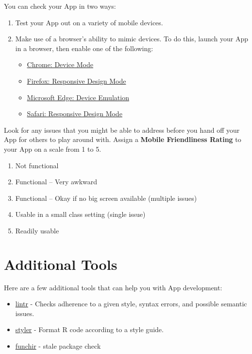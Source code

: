 \documentclass[
]{book}
\providecommand{\tightlist}{%
  \setlength{\itemsep}{0pt}\setlength{\parskip}{0pt}}
\begin{document}
You can check your App in two ways:

\begin{enumerate}
\def\labelenumi{\arabic{enumi}.}
\tightlist
\item
  Test your App out on a variety of mobile devices.
\item
  Make use of a browser's ability to mimic devices. To do this, launch your App in a browser, then enable one of the following:

  \begin{itemize}
  \tightlist
  \item
    \href{https://developers.google.com/web/tools/chrome-devtools/device-mode/\#viewport}{Chrome: Device Mode}
  \item
    \href{https://developer.mozilla.org/en-US/docs/Tools/Responsive_Design_Mode}{Firefox: Responsive Design Mode}
  \item
    \href{https://docs.microsoft.com/en-us/microsoft-edge/devtools-guide/emulation}{Microsoft Edge: Device Emulation}
  \item
    \href{https://support.apple.com/en-gb/guide/safari-developer/dev84bd42758/mac}{Safari: Responsive Design Mode}
  \end{itemize}
\end{enumerate}

Look for any issues that you might be able to address before you hand off your App for others to play around with. Assign a \textbf{Mobile Friendliness Rating} to your App on a scale from 1 to 5.

\begin{enumerate}
\def\labelenumi{\arabic{enumi}.}
\tightlist
\item
  Not functional
\item
  Functional -- Very awkward
\item
  Functional -- Okay if no big screen available (multiple issues)
\item
  Usable in a small class setting (single issue)
\item
  Readily usable
\end{enumerate}

\hypertarget{addTools}{%
\chapter{Additional Tools}\label{addTools}}

Here are a few additional tools that can help you with App development:

\begin{itemize}
\tightlist
\item
  \href{https://github.com/jimhester/lintr}{lintr} - Checks adherence to a
  given style, syntax errors, and possible semantic issues.
\item
  \href{https://www.tidyverse.org/articles/2017/12/styler-1.0.0/}{styler} -
  Format R code according to a style guide.
\item
  \href{https://github.com/MichaelChirico/funchir}{funchir} - stale package
  check
\end{itemize}
\end{document}
